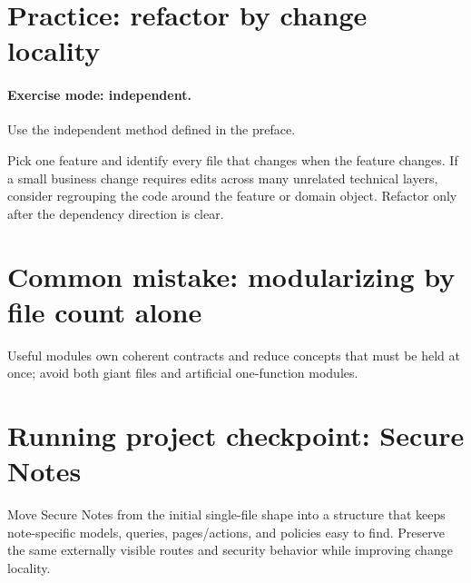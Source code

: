 \section{Practice: refactor by change locality}
\paragraph{Exercise mode: independent.} Use the independent method defined in the preface.

Pick one feature and identify every file that changes when the feature changes. If a small business change requires edits across many unrelated technical layers, consider regrouping the code around the feature or domain object. Refactor only after the dependency direction is clear.

\section{Common mistake: modularizing by file count alone}
Useful modules own coherent contracts and reduce concepts that must be held at once; avoid both giant files and artificial one-function modules.

\section{Running project checkpoint: Secure Notes}
Move Secure Notes from the initial single-file shape into a structure that keeps note-specific models, queries, pages/actions, and policies easy to find. Preserve the same externally visible routes and security behavior while improving change locality.
